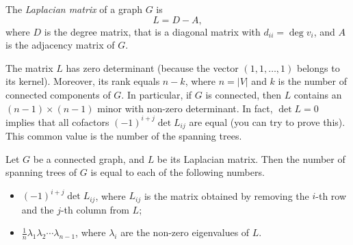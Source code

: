 \begin{page}
\setcounter{section}{2}
\setcounter{subsection}{5}
\setcounter{dfn}{14}
\label{portion:294}

\begin{dfn}
The \emph{Laplacian matrix} of a graph $G$ is
\[
L = D - A,
\]
where $D$ is the degree matrix, that is a diagonal matrix with $d_{ii} = \deg v_i$, and $A$ is the adjacency matrix of $G$.
\end{dfn}

\end{page}

\begin{page}
\setcounter{section}{2}
\setcounter{subsection}{5}
\setcounter{dfn}{14}
\label{portion:295}


The matrix $L$ has zero determinant (because the vector $(1, 1, \ldots, 1)$ belongs to its kernel).
Moreover, its rank equals $n-k$, where $n = |V|$ and $k$ is the number of connected components of $G$.
In particular, if $G$ is connected, then $L$ contains an $(n-1) \times (n-1)$ minor with non-zero determinant.
In fact, $\det L = 0$ implies that all cofactors $(-1)^{i+j} \det L_{ij}$ are equal (you can try to prove this).
This common value is the number of the spanning trees.


\end{page}

\begin{page}
\setcounter{section}{2}
\setcounter{subsection}{5}
\setcounter{dfn}{15}
\label{portion:297}

\begin{thm}[Kirchhoff]
Let $G$ be a connected graph, and $L$ be its Laplacian matrix.
Then the number of spanning trees of $G$ is equal to each of the following numbers.
\begin{itemize}
\item $(-1)^{i+j} \det L_{ij}$, where $L_{ij}$ is the matrix obtained by removing the $i$-th row and the $j$-th column from $L$;
\item $\frac{1}{n} \lambda_1 \lambda_2 \cdots \lambda_{n-1}$, where $\lambda_i$ are the non-zero eigenvalues of $L$.
\end{itemize}
\end{thm}

\end{page}

